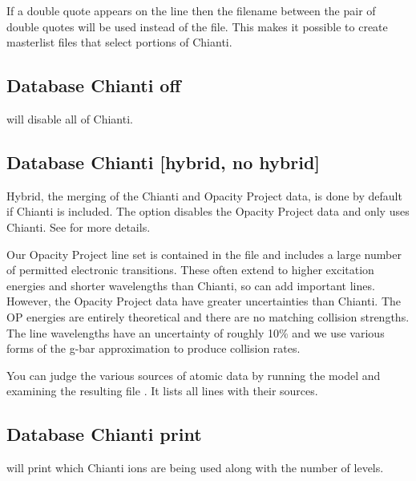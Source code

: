 If a double quote appears on the line then the filename
between the pair of double quotes will be used instead of
the  file.
This makes it possible to create masterlist files that select portions
of Chianti.

\subsection{Database Chianti off} 
will disable all of Chianti.

\subsection{Database Chianti [hybrid, no hybrid]} 
Hybrid, the merging of the Chianti and Opacity Project data, 
is done by default if Chianti is included.
The  option disables the Opacity Project data and only uses Chianti.
See \citet{2013MNRAS.429.3133L} for more details.

Our Opacity Project line set is contained in the file  and
includes a large number of permitted electronic transitions. These often
extend to higher excitation energies and shorter wavelengths than Chianti,
so can add important lines. However, the Opacity Project data have greater
uncertainties than Chianti. The OP energies are entirely theoretical and
there are no matching collision strengths.
The line wavelengths have an uncertainty of roughly 10\% and we use
various forms of the g-bar approximation to produce collision rates.

You can judge the various sources of atomic data by running the model
 and examining the resulting file .
It lists all lines with their sources.

\subsection{Database Chianti print} 
will print which Chianti ions are being used
along with the number of levels.
 
